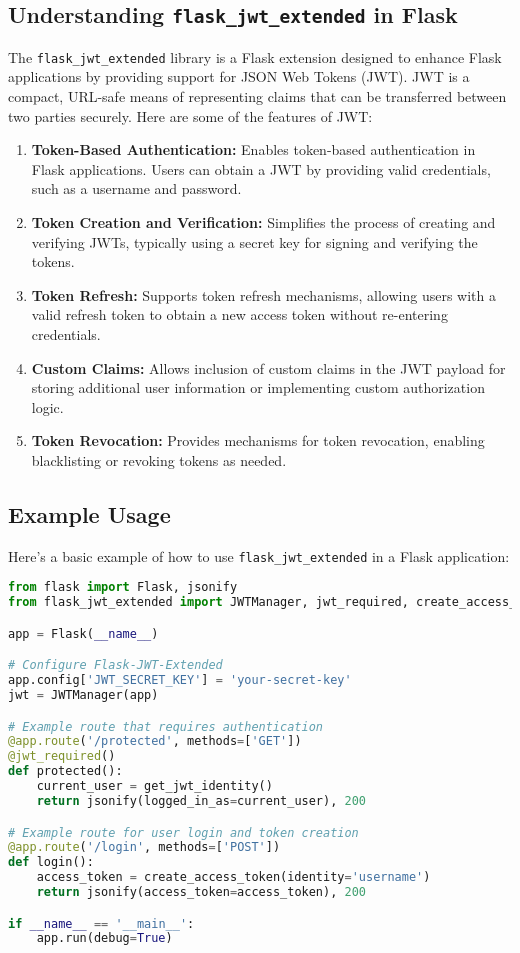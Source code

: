 \subsection{Understanding \texttt{flask\_jwt\_extended} in Flask}

The \texttt{flask\_jwt\_extended} library is a Flask extension designed to enhance Flask applications by providing support for JSON Web Tokens (JWT). JWT is a compact, URL-safe means of representing claims that can be transferred between two parties securely. Here are some of the features of JWT:

\begin{enumerate}
  \item \textbf{Token-Based Authentication:} Enables token-based authentication in Flask applications. Users can obtain a JWT by providing valid credentials, such as a username and password.

  \item \textbf{Token Creation and Verification:} Simplifies the process of creating and verifying JWTs, typically using a secret key for signing and verifying the tokens.

  \item \textbf{Token Refresh:} Supports token refresh mechanisms, allowing users with a valid refresh token to obtain a new access token without re-entering credentials.

  \item \textbf{Custom Claims:} Allows inclusion of custom claims in the JWT payload for storing additional user information or implementing custom authorization logic.

  \item \textbf{Token Revocation:} Provides mechanisms for token revocation, enabling blacklisting or revoking tokens as needed.
\end{enumerate}

\subsection{Example Usage}
Here's a basic example of how to use \texttt{flask\_jwt\_extended} in a Flask application:

\begin{lstlisting}[language=Python, frame=single]
from flask import Flask, jsonify
from flask_jwt_extended import JWTManager, jwt_required, create_access_token

app = Flask(__name__)

# Configure Flask-JWT-Extended
app.config['JWT_SECRET_KEY'] = 'your-secret-key'
jwt = JWTManager(app)

# Example route that requires authentication
@app.route('/protected', methods=['GET'])
@jwt_required()
def protected():
    current_user = get_jwt_identity()
    return jsonify(logged_in_as=current_user), 200

# Example route for user login and token creation
@app.route('/login', methods=['POST'])
def login():
    access_token = create_access_token(identity='username')
    return jsonify(access_token=access_token), 200

if __name__ == '__main__':
    app.run(debug=True)
\end{lstlisting}

